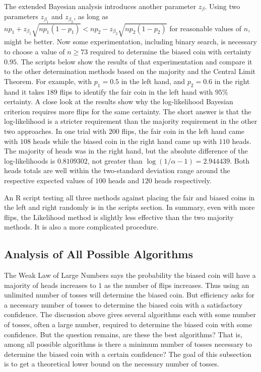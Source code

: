 \documentclass[12pt]{article}
\begin{document}
The extended Bayesian analysis introduces another parameter \( z_{\beta}
\).  Using two parameters \( z_{\beta_1} \) and \( z_{\beta_2} \), as
long as \( np_1+z_{\beta_1}\sqrt{np_1(1-p_1)} < np_2-z_{\beta_2}\sqrt{np_2
(1-p_2)} \) for reasonable values of \( n \), might be better. Now some
experimentation, including binary search, is necessary to choose a value
of \( n \ge 73 \) required to determine the biased coin with certainty \(
0.95 \).  The scripts below show the results of that experimentation and
compare it to the other determination methods based on the majority and
the Central Limit Theorem.  For example, with \( p_1 = 0.5 \) in the
left hand, and \( p_2 = 0.6 \) in the right hand it takes \( 189 \)
flips to identify the fair coin in the left hand with \( 95\% \)
certainty.  A close look at the results show why the log-likelihood
Bayesian criterion requires more flips for the same certainty.  The
short answer is that the log-likelihood is a stricter requirement than
the majority requirement in the other two approaches.  In one trial with
\( 200 \) flips, the fair coin in the left hand came with \( 108 \)
heads while the biased coin in the right hand came up with \( 110 \)
heads.  The majority of heads was in the right hand, but the absolute
difference of the log-likelihoods is \( 0.8109302 \), not greater than \(
\log(1/\alpha-1) = 2.944439 \).  Both heads totals are well within the
two-standard deviation range around the respective expected values of \(
100 \) heads and \( 120 \) heads respectively.

An R script testing all three methods against placing the fair and
biased coins in the left and right randomly is in the scripts section.
In summary, even with more flips, the Likelihood method is slightly less
effective than the two majority methods.  It is also a more complicated
procedure.

\subsection*{Analysis of All Possible Algorithms}

The Weak
Law of Large Numbers says the probability the biased coin will
have a majority of heads increases to \( 1 \) as the number of flips
increases.   Thus using an unlimited number of tosses will
determine the biased coin.  But efficiency asks for a necessary
number of tosses to determine the biased coin with a satisfactory
confidence.  The discussion above gives several algorithms each with
some number of tosses, often a large number, required to determine the
biased coin with some confidence.  But the question remains, are
these the best algorithms?  That is,  among all possible algorithms is
there a minimum number of tosses necessary to determine the biased
coin with a certain confidence?  The goal of this subsection is to get
a theoretical lower bound on the necessary number of tosses.
\end{document}
